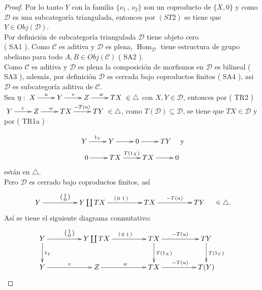 \documentclass{article}
\newcommand{\spmat}[1]{%
  \left(\begin{smallmatrix}#1\end{smallmatrix}\right)%
}
\begin{document}
\begin{enumerate}
\begin{proof}
Por lo tanto $Y$ con la familia $\{\nu_1\,,\,\nu_2\}$ son un coproducto de $\{X,0\}$ y como $\mathscr{D}$ es una subcategoría triangulada, entonces 
por $( ST2 )$ se tiene que $Y\in Obj(\mathscr{D})$.\\

 Por definición de subcategoría triangulada $\mathscr{D}$ tiene objeto cero \\( SA1 ). Como $\mathscr{C}$ es aditiva y $\mathscr{D}$ es 
plena, $\operatorname{Hom}_{\mathscr{D}}$ tiene estructura de grupo abeliano para todo $A,B\in Obj(\mathscr{C})$ ( SA2 ).\\

Como $\mathscr{C}$ es aditiva y $\mathscr{D}$ es plena la composición de morfismos en $\mathscr{D}$ es bilineal ( SA3 ), además, por definición
$\mathscr{D}$ es cerrada bajo coproductos finitos ( SA4 ), asi $\mathscr{D}$ es  subcategoría aditiva de $\mathscr{C}$.\\

 Sea $\eta: \xymatrix{X\ar[r]^u & Y\ar[r]^v & Z\ar[r]^w & TX } \in \triangle$ con $X,Y\in \mathscr{D}$, entonces por ( TR2 ) 
$\xymatrix{Y\ar[r]^v & Z\ar[r]^w & TX\ar[r]^{-T(u)} & TY} \in \triangle$, como $T(\mathscr{D})\subseteq \mathscr{D}$, se tiene que $TX\in 
\mathscr{D}$ y por ( TR1a ) 

\begin{gather*}
\xymatrix{Y\ar[r]^{1_Y}&Y\ar[r]&0\ar[r]&TY}\quad \text{y}\\
\xymatrix{0\ar[r]&TX\ar[r]^{T(1_{X})}&TX\ar[r]&0}
\end{gather*}
están en $\triangle$.\\

Pero $\mathscr{D}$ es cerrado bajo coproductos finitos, así 
\begin{equation*}
\xymatrix@C+2pc{Y\ar[r]^{\spmat{1 \\ 0}} & Y\coprod TX\ar[r]^{\spmat{ 0 & 1}} & TX\ar[r]^{-T(u)} & TY}\quad \in \triangle .
\end{equation*}
Así se tiene el siguiente diagrama conmutativo:\\


\begin{equation*}
\xymatrix@C+2pc{Y\ar[r]^{\spmat{1 \\ 0}}\ar[d]^{1_Y} & Y\coprod TX\ar[r]^{\spmat{ 0 & 1}} & TX\ar[d]^{T(1_X)}\ar[r]^{-T(u)} 
& TY\ar[d]^{T(1_Y)}\\
Y\ar[r]^v & Z\ar[r]^w & TX\ar[r]^{-T(u)} & T(Y)}
\end{equation*}


\end{proof}
\end{enumerate}
\end{document}
